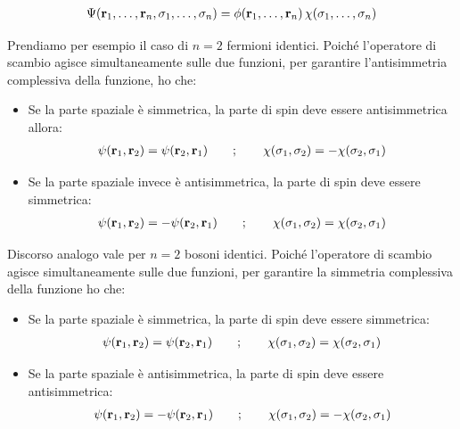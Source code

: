 \begin{align*}
	\Psi\qty(\vb{r}_1, \ldots, \vb{r}_n, \sigma_1, \ldots, \sigma_n) = \phi\qty(\vb{r}_1, \ldots, \vb{r}_n) \, \chi\qty(\sigma_1, \ldots, \sigma_n)
\end{align*}

	Prendiamo per esempio il caso di $n  = 2$ fermioni identici. Poiché l'operatore di scambio agisce simultaneamente sulle due funzioni, per garantire l'antisimmetria complessiva della funzione, ho che:

\begin{itemize}
	\item Se la parte spaziale è simmetrica, la parte di spin deve essere antisimmetrica allora:
	\begin{align*}
		\psi\qty(\vb{r}_1, \vb{r}_2) = \psi\qty(\vb{r}_2, \vb{r}_1) \qquad ; \qquad \chi\qty(\sigma_1, \sigma_2) = - \chi\qty(\sigma_2, \sigma_1)
	\end{align*}

	\item Se la parte spaziale invece è antisimmetrica, la parte di spin deve essere simmetrica:
	\begin{align*}
		\psi\qty(\vb{r}_1, \vb{r}_2) = - \psi\qty(\vb{r}_2, \vb{r}_1) \qquad ; \qquad \chi\qty(\sigma_1, \sigma_2) = \chi\qty(\sigma_2, \sigma_1)
	\end{align*}
	
\end{itemize}
		
	Discorso analogo vale per $n = 2$ bosoni identici. Poiché l'operatore di scambio agisce simultaneamente sulle due funzioni, per garantire la simmetria complessiva della funzione ho che:
	
\begin{itemize}
	
	\item Se la parte spaziale è simmetrica, la parte di spin deve essere simmetrica:
	\begin{align*}
		\psi\qty(\vb{r}_1, \vb{r}_2) =  \psi\qty(\vb{r}_2, \vb{r}_1) \qquad ; \qquad \chi\qty(\sigma_1, \sigma_2) = \chi\qty(\sigma_2, \sigma_1)
	\end{align*}
	
	\item Se la parte spaziale è antisimmetrica, la parte di spin deve essere antisimmetrica:
	\begin{align*}
		\psi\qty(\vb{r}_1, \vb{r}_2) =  -\psi\qty(\vb{r}_2, \vb{r}_1) \qquad ; \qquad \chi\qty(\sigma_1, \sigma_2) = -\chi\qty(\sigma_2, \sigma_1)
	\end{align*}
	
\end{itemize}

